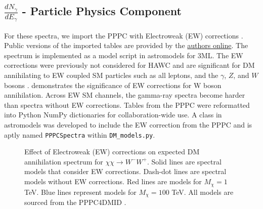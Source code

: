 \subsection{$\frac{dN_\gamma}{dE_\gamma}$ - Particle Physics Component}\label{sec:gd_particlephysics}

For these spectra, we import the PPPC with Electroweak (EW) corrections \cite{Cirelli_2011}.
Public versions of the imported tables are provided by the \href{http://www.marcocirelli.net/PPPC4DMID.html}{authors online}.
The spectrum is implemented as a model script in astromodels for 3ML.
The EW corrections were previously not considered for HAWC and are significant for DM annihilating to EW coupled SM particles such as all leptons, and the $\gamma$, $Z$, and $W$ bosons \cite{Albert_2018}.
 demonstrates the significance of EW corrections for W boson annihilation.
Across EW SM channels, the gamma-ray spectra become harder than spectra without EW corrections.
Tables from the PPPC were reformatted into Python NumPy dictionaries for collaboration-wide use.
A class in astromodels was developed to include the EW correction from the PPPC and is aptly named \texttt{PPPCSpectra} within \texttt{DM\_models.py}.

\begin{figure}[t]
\caption{Effect of Electroweak (EW) corrections on expected DM annihilation spectrum for $\chi\chi \rightarrow W^-W^+$. Solid lines are spectral models that consider EW corrections. Dash-dot lines are spectral models without EW corrections. Red lines are models for $M_\chi = 1$ TeV. Blue lines represent models for $M_\chi = 100$ TeV. All models are sourced from the PPPC4DMID \cite{Cirelli_2011}.}
\label{fig:ew_vs_noew}
\end{figure}

